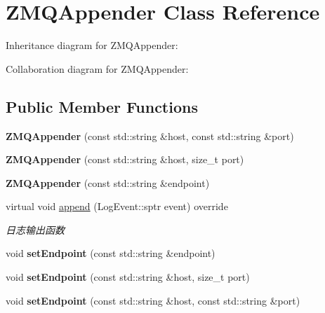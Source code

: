 \hypertarget{classZMQAppender}{}\section{Z\+M\+Q\+Appender Class Reference}
\label{classZMQAppender}


Inheritance diagram for Z\+M\+Q\+Appender\+:


Collaboration diagram for Z\+M\+Q\+Appender\+:
\subsection*{Public Member Functions}
\begin{DoxyCompactItemize}
\item 
\mbox{\label{classZMQAppender_ab8d65b04017d573bb0a8f40e562da98e}} 
{\bfseries Z\+M\+Q\+Appender} (const std\+::string \&host, const std\+::string \&port)
\item 
\mbox{\label{classZMQAppender_a67ac71d28bc6cacb7058e8275c723a21}} 
{\bfseries Z\+M\+Q\+Appender} (const std\+::string \&host, size\+\_\+t port)
\item 
\mbox{\label{classZMQAppender_a79b02a12355eb4f50102feab2fc57c5b}} 
{\bfseries Z\+M\+Q\+Appender} (const std\+::string \&endpoint)
\item 
virtual void \hyperlink{classZMQAppender_a318ff01f9c6c8fbe93da0d0598aadab9}{append} (Log\+Event\+::sptr event) override
\begin{DoxyCompactList}\small\item\em 日志输出函数 \end{DoxyCompactList}\item 
\mbox{\label{classZMQAppender_afd8b23cbeec3773870f346dc3306b4e3}} 
void {\bfseries set\+Endpoint} (const std\+::string \&endpoint)
\item 
\mbox{\label{classZMQAppender_a3a845e48c0c7efe71dbc799117a08472}} 
void {\bfseries set\+Endpoint} (const std\+::string \&host, size\+\_\+t port)
\item 
\mbox{\label{classZMQAppender_a8630b1e0d522a739bfef801b504af9d9}} 
void {\bfseries set\+Endpoint} (const std\+::string \&host, const std\+::string \&port)
\end{DoxyCompactItemize}
